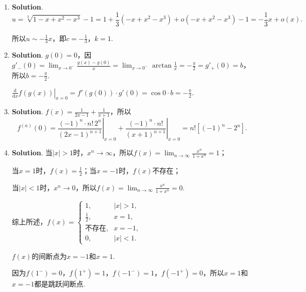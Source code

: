 \documentclass[../Main.tex]{subfiles}
\begin{document}
\begin{enumerate}
          设$\frac{\mathrm{d}^{k} y}{\mathrm{d}x^{k}}=m^{k} t^{m}$，则$\frac{\mathrm{d}^{k+1}y}{\mathrm{d}x^{k+1}}
              =\frac{\mathrm{d}}{\mathrm{d}t}\left (\frac{\mathrm{d}^{k} y}{\mathrm{d}x^{k}}
              \right)\cdot\frac{\mathrm{d}t}{\mathrm{d}x}=\left(m^{k} t^{m}\right)'\cdot\frac{1}{\frac{1}{t}}
              =m^{k+1}t^{m}$.

          由数学归纳法得$\frac{\mathrm{d}^{n} y}{\mathrm{d}x^{n}}=m^{n} t^{m}$，所以$\left
              .\frac{\mathrm{d}^{n} y}{\mathrm{d}x^{n}}\right|_{t=1}=m^{n}$.

    \item \textbf{Solution}.
          \[
              u = \sqrt[3]{1-x+x^{2}-x^{3}}-1 = 1+\frac{1}{3}(-x+x^{2}-x^{3})+o(-x+x^{2}
              -x^{3})-1=-\frac{1}{3}x+o(x).
          \]

          所以$u\sim -\frac{1}{3}x$，即$c=-\frac{1}{3}$，$k=1$.

    \item \textbf{Solution}. $g(0)=0$，因$g'_{-}(0)=\lim_{x\to0^-}\frac{g(x)-g(0)}{x}
              =\lim_{x\to0^-}\arctan \frac{1}{x}=-\frac{\pi}{2}=g'_{+}(0)=b$，所以$b=-\frac{\pi}{2}$.

          $\left.\frac{\mathrm{d}}{\mathrm{d}x}f\left(g(x)\right)\right|_{x=0}=f'(g(0
              ))\cdot g'(0)=\cos 0 \cdot b=-\frac{\pi}{2}$.

    \item \textbf{Solution}. $f(x)=\frac{1}{2x-1}+\frac{1}{x+1}$，所以
          \[
              f^{(n)}(0)=\left.\frac{(-1)^{n}\cdot n!\,2^{n}}{(2x-1)^{n+1}}\right|_{x=0}
              +\left.\frac{(-1)^{n}\cdot n!}{(x+1)^{n+1}}\right|_{x=0}=n!\left[(-1)^{n}
                  -2^{n}\right].
          \]

    \item \textbf{Solution}. 当$|x|>1$时，$x^{n}\to\infty$，所以$f(x)=\lim_{n\to\infty}
              \frac{x^{n}}{1+x^{n}}=1$；

          当$x=1$时，$f(x)=\frac{1}{2}$；当$x=-1$时，$f(x)$不存在；

          当$|x|<1$时，$x^{n}\to0$，所以$f(x)=\lim_{n\to\infty}\frac{x^{n}}{1+x^{n}}=
              0$.

          综上所述，$f(x)=
              \begin{cases}
                  1,           & |x|>1, \\
                  \frac{1}{2}, & x=1,   \\
                  \text{不存在},  & x=-1,  \\
                  0,           & |x|<1.
              \end{cases}$

          $f(x)$的间断点为$x=-1$和$x=1$.

          因为$f(1^{-})=0$，$f(1^{+})=1$，$f(-1^{-})=1$，$f(-1^{+})=0$，所以$x=1$和$x
              =-1$都是跳跃间断点.
\end{enumerate}
\end{document}
